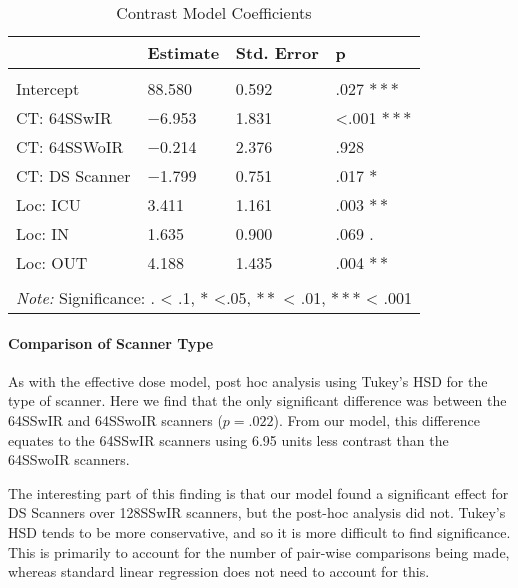\documentclass[]{article}
\let\oldparagraph\paragraph
\renewcommand{\paragraph}[1]{\oldparagraph{#1}\mbox{}}
\begin{document}
\begin{table}[H] \centering 
  \caption{Contrast Model Coefficients} 
\begin{tabular}{p{3cm}|p{3cm}p{3cm}p{3cm}}
\\[-1.8ex] \hline 
\hline
    & Estimate & Std. Error & p  \\
\hline \\[-1.8ex] 
 Intercept   & 88.580 & 0.592 & .027 $***$ \\
 CT: 64SSwIR & $-$6.953 & 1.831 & <.001 $***$  \\
 CT: 64SSWoIR & $-$0.214 & 2.376 & .928 \\
 CT: DS Scanner &$-$1.799 & 0.751 & .017 $*$ \\
 Loc: ICU & 3.411 & 1.161 & .003 $**$\\
 Loc: IN & 1.635 & 0.900 & .069 $.$ \\
 Loc: OUT & 4.188 & 1.435 & .004 $**$ \\
\hline 
\hline \\[-1.8ex]
\multicolumn{4}{l}{\textit{Note:} Significance: $.$ < .1, $*$ <.05, $**$ < .01, $***$ < .001}
 \end{tabular}
\end{table}

\paragraph{Comparison of Scanner
Type}\label{comparison-of-scanner-type-1}

As with the effective dose model, post hoc analysis using Tukey's HSD
for the type of scanner. Here we find that the only significant
difference was between the 64SSwIR and 64SSwoIR scanners (\(p = .022\)).
From our model, this difference equates to the 64SSwIR scanners using
6.95 units less contrast than the 64SSwoIR scanners.

The interesting part of this finding is that our model found a
significant effect for DS Scanners over 128SSwIR scanners, but the
post-hoc analysis did not. Tukey's HSD tends to be more conservative,
and so it is more difficult to find significance. This is primarily to
account for the number of pair-wise comparisons being made, whereas
standard linear regression does not need to account for this.
\end{document}
